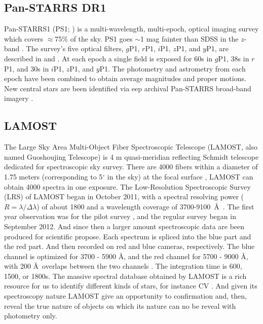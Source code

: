 \documentclass[fleqn,usenatbib]{mnras}
\begin{document}
\subsection{Pan-STARRS DR1}
\label{sec:PS1}

Pan-STARRS1 (PS1; \citealp{Kaiser:2010}) is a multi-wavelength, multi-epoch,
optical imaging survey which covers $\approx$75\% of the sky. PS1 goes $\sim$1 mag
fainter than SDSS in the $z$-band \citep{York:2000}. The survey’s five optical
filters, $g$P1, $r$P1, $i$P1, $z$P1, and $y$P1, are described in
\citet{Stubbs:2010} and \citet{Tonry:2012}. At each epoch a single field
is exposed for 60s in $g$P1, 38s in $r$P1, and 30s in $i$P1, $z$P1,
and $y$P1. The photometry and astrometry from each epoch
have been combined to obtain average magnitudes and proper
motions. New central stars are been identified via
eep archival Pan-STARRS broad-band imagery \citep{Tan:2023}. 

\subsection{LAMOST}
\label{sec:lamost}

The Large Sky Area Multi-Object Fiber Spectroscopic Telescope
(LAMOST, also named Guoshoujing Telescope) is 4 m quasi-meridian reflecting
Schmidt telescope dedicated for spectroscopic sky survey.
There are 4000 fibers within a diameter of 1.75 meters (corresponding
to 5$^{\circ}$ in the sky) at the focal surface \citep{Cui:2012}, LAMOST can
obtain 4000 spectra in one exposure.
The Low-Resolution Spectroscopic Survey (LRS) of LAMOST
began in October 2011, with a spectral resolving power
($R = \lambda/\Delta\lambda$) of about 1800 and a wavelength coverage of
3700-9100~\AA~\citep{Zhao:2012}. The first year observation was
for the pilot survey \citep{Luo:2012, Zhao:2012},
and the regular survey began in September 2012. And since then
a larger amount  spectroscopic data are been produced for
scientific propose. Each spectrum is spliced into the blue part and the red part.
And then recorded on red and blue cameras, respectively.
The blue channel is optimized for 3700 - 5900  \AA, and the red channel for
5700 - 9000  \AA, with 200 \AA~overlaps between the two channels \citep{Yao:2019}.
The integration time is 600, 1500, or 1800s. The massive spectral
database obtained by LAMOST is a rich resource for us to identify
different kinds of stars, for instance CV \citep{Sun:2021}. And given
its spectroscopy nature LAMOST give an opportunity to confirmation and, then,
reveal the true nature of objects on which its nature
can no be reveal with photometry only.
\end{document}
